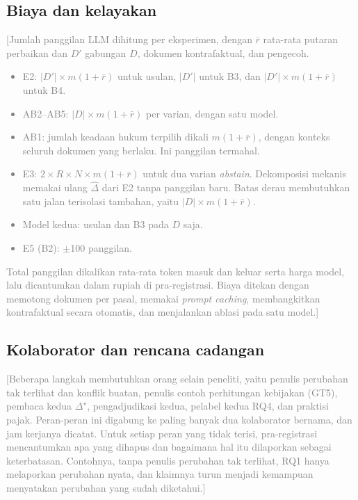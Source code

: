 \documentclass[journal,a4paper]{IEEEtran}
\newcommand{\en}[1]{\textit{#1}}
\newcommand{\emas}{\star}
\newif\ifrancangan \rancangantrue
\newcommand{\isian}[1]{\ifrancangan\textcolor{gray}{[#1]}\fi}
\begin{document}
\subsection{Biaya dan kelayakan}
\isian{Jumlah panggilan LLM dihitung per eksperimen, dengan $\bar{r}$ rata-rata putaran perbaikan dan $D'$ gabungan $D$, dokumen kontrafaktual, dan pengecoh.
\begin{itemize}[leftmargin=*,nosep]
  \item E2: $|D'| \times m(1+\bar{r})$ untuk usulan, $|D'|$ untuk B3, dan $|D'| \times m(1+\bar{r})$ untuk B4.
  \item AB2--AB5: $|D| \times m(1+\bar{r})$ per varian, dengan satu model.
  \item AB1: jumlah keadaan hukum terpilih dikali $m(1+\bar{r})$, dengan konteks seluruh dokumen yang berlaku. Ini panggilan termahal.
  \item E3: $2 \times R \times N \times m(1+\bar{r})$ untuk dua varian \en{abstain}. Dekomposisi mekanis memakai ulang $\hat{\Delta}$ dari E2 tanpa panggilan baru. Batas derau membutuhkan satu jalan terisolasi tambahan, yaitu $|D| \times m(1+\bar{r})$.
  \item Model kedua: usulan dan B3 pada $D$ saja.
  \item E5 (B2): $\pm$100 panggilan.
\end{itemize}
Total panggilan dikalikan rata-rata token masuk dan keluar serta harga model, lalu dicantumkan dalam rupiah di pra-registrasi. Biaya ditekan dengan memotong dokumen per pasal, memakai \en{prompt caching}, membangkitkan kontrafaktual secara otomatis, dan menjalankan ablasi pada satu model.}

\subsection{Kolaborator dan rencana cadangan}
\isian{Beberapa langkah membutuhkan orang selain peneliti, yaitu penulis perubahan tak terlihat dan konflik buatan, penulis contoh perhitungan kebijakan (GT5), pembaca kedua $\Delta^{\emas}$, pengadjudikasi kedua, pelabel kedua RQ4, dan praktisi pajak. Peran-peran ini digabung ke paling banyak dua kolaborator bernama, dan jam kerjanya dicatat. Untuk setiap peran yang tidak terisi, pra-registrasi mencantumkan apa yang dihapus dan bagaimana hal itu dilaporkan sebagai keterbatasan. Contohnya, tanpa penulis perubahan tak terlihat, RQ1 hanya melaporkan perubahan nyata, dan klaimnya turun menjadi kemampuan menyatakan perubahan yang sudah diketahui.}
\end{document}
